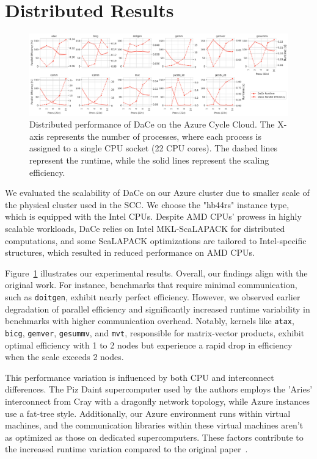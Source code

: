 \section{Distributed Results}
\label{sec:distributed-result}

\begin{figure}[tp]
    \centering
    \includegraphics[width=.95\textwidth]{imgs/heatmap_distr.pdf}
    \caption{Distributed performance of DaCe on the Azure Cycle Cloud. The X-axis represents the number of processes, where each process is assigned to a single CPU socket (22 CPU cores). The dashed lines represent the runtime, while the solid lines represent the scaling efficiency.}
    \label{fig:heatmap_distr}
\end{figure}

We evaluated the scalability of DaCe on our Azure cluster due to smaller scale of the physical cluster used in the SCC. We choose the "hb44rs" instance type, which is equipped with the Intel CPUs. Despite AMD CPUs' prowess in highly scalable workloads, DaCe relies on Intel MKL-ScaLAPACK for distributed computations, and some ScaLAPACK optimizations are tailored to Intel-specific structures, which resulted in reduced performance on AMD CPUs.

Figure~\ref{fig:heatmap_distr} illustrates our experimental results. Overall, our findings align with the original work. For instance, benchmarks that require minimal communication, such as \texttt{doitgen}, exhibit nearly perfect efficiency. However, we observed earlier degradation of parallel efficiency and significantly increased runtime variability in benchmarks with higher communication overhead. Notably, kernels like \texttt{atax}, \texttt{bicg}, \texttt{gemver}, \texttt{gesummv}, and \texttt{mvt}, responsible for matrix-vector products, exhibit optimal efficiency with 1 to 2 nodes but experience a rapid drop in efficiency when the scale exceeds 2 nodes.

This performance variation is influenced by both CPU and interconnect differences. The Piz Daint supercomputer used by the authors employs the 'Aries' interconnect from Cray with a dragonfly network topology, while Azure instances use a fat-tree style. Additionally, our Azure environment runs within virtual machines, and the communication libraries within these virtual machines aren't as optimized as those on dedicated supercomputers. These factors contribute to the increased runtime variation compared to the original paper~\cite{dace2021}.


